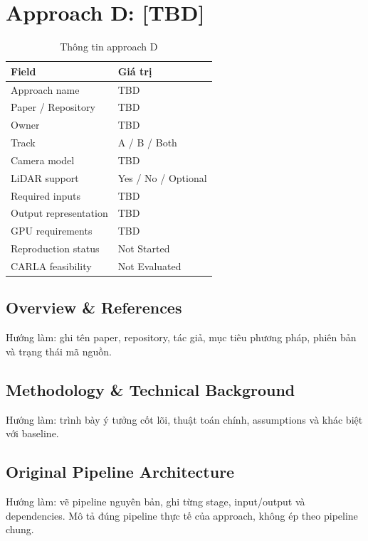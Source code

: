 \chapter{Approach D: [TBD]}

\begin{table}[H]
  \centering
  \caption{Thông tin approach D}
  \begin{tabularx}{\linewidth}{l X}
    \toprule
    \textbf{Field} & \textbf{Giá trị} \\
    \midrule
    Approach name & TBD \\
    Paper / Repository & TBD \\
    Owner & TBD \\
    Track & A / B / Both \\
    Camera model & TBD \\
    LiDAR support & Yes / No / Optional \\
    Required inputs & TBD \\
    Output representation & TBD \\
    GPU requirements & TBD \\
    Reproduction status & Not Started \\
    CARLA feasibility & Not Evaluated \\
    \bottomrule
  \end{tabularx}
\end{table}

\section{Overview \& References}

Hướng làm: ghi tên paper, repository, tác giả, mục tiêu phương pháp, phiên bản và trạng thái mã nguồn.

\section{Methodology \& Technical Background}

Hướng làm: trình bày ý tưởng cốt lõi, thuật toán chính, assumptions và khác biệt với baseline.

\section{Original Pipeline Architecture}

Hướng làm: vẽ pipeline nguyên bản, ghi từng stage, input/output và dependencies.
Mô tả đúng pipeline thực tế của approach, không ép theo pipeline chung.

